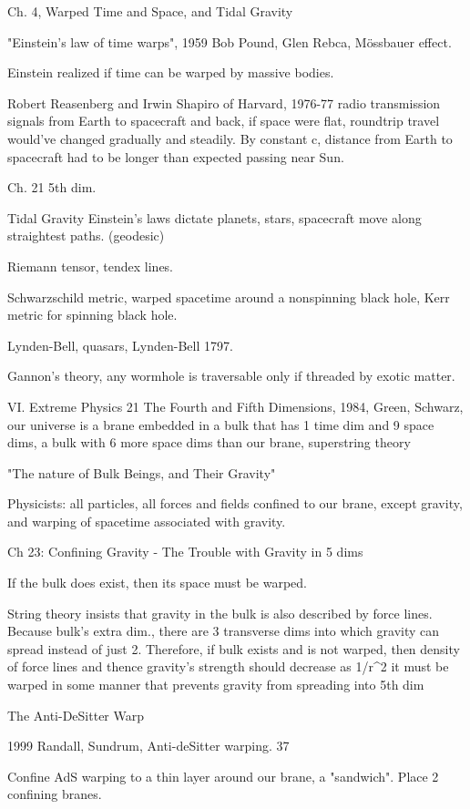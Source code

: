 \documentclass[10pt]{amsart}
\begin{document}
Ch. 4, Warped Time and Space, and Tidal Gravity

"Einstein's law of time warps", 1959 Bob Pound, Glen Rebca, M\"{o}ssbauer effect.

Einstein realized if time can be warped by massive bodies.

Robert Reasenberg and Irwin Shapiro of Harvard, 1976-77 radio transmission signals from Earth to spacecraft and back, if space were flat, roundtrip travel would've changed gradually and steadily. By constant c, distance from Earth to spacecraft had to be longer than expected passing near Sun.

Ch. 21 5th dim.

Tidal Gravity
Einstein's laws dictate planets, stars, spacecraft move along straightest paths. (geodesic)

Riemann tensor, tendex lines.

Schwarzschild metric, warped spacetime around a nonspinning black hole, Kerr metric for spinning black hole.

Lynden-Bell, quasars, Lynden-Bell 1797.

Gannon's theory, any wormhole is traversable only if threaded by exotic matter.

VI. Extreme Physics 21 The Fourth and Fifth Dimensions, 1984, Green, Schwarz, our universe is a brane embedded in a bulk that has 1 time dim and 9 space dims, a bulk with 6 more space dims than our brane, superstring theory

"The nature of Bulk Beings, and Their Gravity"

Physicists: all particles, all forces and fields confined to our brane, except gravity, and warping of spacetime associated with gravity.

Ch 23: Confining Gravity - The Trouble with Gravity in 5 dims

If the bulk does exist, then its space must be warped.

String theory insists that gravity in the bulk is also described by force lines.
Because bulk's extra dim., there are 3 transverse dims into which gravity can spread instead of just 2.
Therefore, if bulk exists and is not warped, then density of force lines and thence gravity's strength should decrease as 1/r^2
it must be warped in some manner that prevents gravity from spreading into 5th dim

The Anti-DeSitter Warp

1999 Randall, Sundrum, Anti-deSitter warping. 37

Confine AdS warping to a thin layer around our brane, a "sandwich". Place 2 confining branes. 
\end{document}
